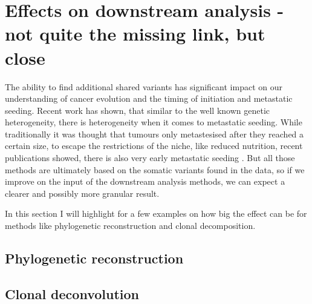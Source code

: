 \section[Effects on downstream analysis]{Effects on downstream analysis - not quite the missing link, but close}
\label{variantcalling-sec:downstream}

The ability to find additional shared variants has significant impact on our understanding of cancer evolution and the timing of initiation and metastatic seeding. Recent work has shown, that similar to the well known genetic heterogeneity, there is heterogeneity when it comes to metastatic seeding. While traditionally it was thought that tumours only metastesised after they reached a certain size, to escape the restrictions of the niche, like reduced nutrition, recent publications showed, there is also very early metastatic seeding \cite{Hu2019}. 
But all those methods are ultimately based on the somatic variants found in the data, so if we improve on the input of the downstream analysis methods, we can expect a clearer and possibly more granular result.

In this section I will highlight for a few examples on how big the effect can be for methods like phylogenetic reconstruction and clonal decomposition.

\subsection[Polygenetic reconstruction]{Phylogenetic reconstruction}
\label{variantcalling-sec:phylo}



\subsection[Clonal deconvolution]{Clonal deconvolution}
\label{variantcalling-sec:clonal}

